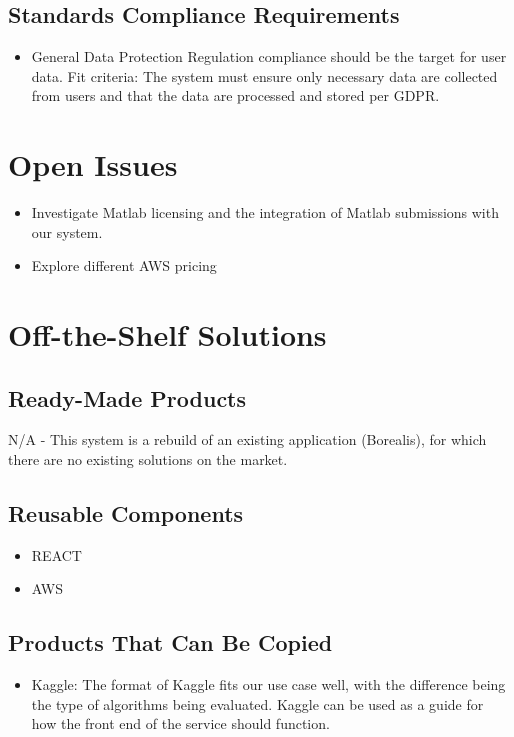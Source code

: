 \documentclass[12pt]{article}
\begin{document}
\subsection{Standards Compliance Requirements}
\begin{itemize}
    \item General Data Protection Regulation compliance should be the target for user data. \hfill \break
    Fit criteria: The system must ensure only necessary data are collected from users and that the data are processed and stored per GDPR. 

\end{itemize}

\section{Open Issues}
\begin{itemize}
    \item Investigate Matlab licensing and the integration of Matlab submissions with our system.
    \item Explore different AWS pricing
\end{itemize}

\section{Off-the-Shelf Solutions}
\subsection{Ready-Made Products}
N/A - This system is a rebuild of an existing application (Borealis), for which there are no existing solutions on the market.
\subsection{Reusable Components}
\begin{itemize}
    \item REACT
    \item AWS
\end{itemize}

\subsection{Products That Can Be Copied}
\begin{itemize}
    \item Kaggle: The format of Kaggle fits our use case well, with the difference being the type of algorithms being evaluated. Kaggle can be used as a guide for how the front end of the service should function.
\end{itemize}
\end{document}

